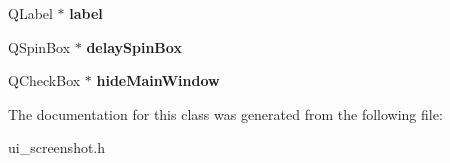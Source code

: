 \begin{DoxyCompactItemize}
\item 
\hypertarget{classUi__screenshot_a748678988896dca422c17f13394f3d90}{
QLabel $\ast$ {\bfseries label}}
\label{classUi__screenshot_a748678988896dca422c17f13394f3d90}

\item 
\hypertarget{classUi__screenshot_a37924d707077bd389b53ac026e132883}{
QSpinBox $\ast$ {\bfseries delaySpinBox}}
\label{classUi__screenshot_a37924d707077bd389b53ac026e132883}

\item 
\hypertarget{classUi__screenshot_acbaa4ec23e0b6f51e1aac36432b3d142}{
QCheckBox $\ast$ {\bfseries hideMainWindow}}
\label{classUi__screenshot_acbaa4ec23e0b6f51e1aac36432b3d142}

\end{DoxyCompactItemize}


The documentation for this class was generated from the following file:\begin{DoxyCompactItemize}
\item 
ui\_\-screenshot.h\end{DoxyCompactItemize}

